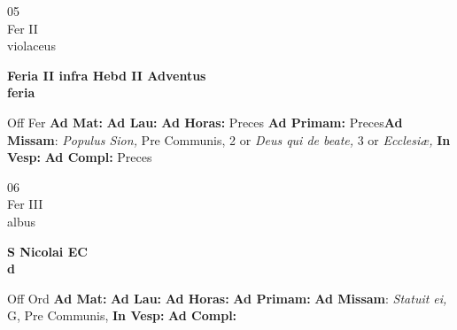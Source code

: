 \documentclass[10pt, openany]{book}
\begin{document}
    \begin{center}
        \begin{minipage}{3.5in}
            \vspace{2em}
            \begin{minipage}{0.5in}
                {\Huge 05} \\
                {\normalsize Fer II} \\
                {\normalsize violaceus}
            \end{minipage}
            \begin{minipage}{3.0in}
                \textbf{ \large Feria II infra Hebd II Adventus \\
                \textnormal{\normalsize feria}} \\ 
            \end{minipage}
            \begin{justify}Off Fer
                \textbf{Ad Mat: }
                \textbf{Ad Lau: }
                \textbf{Ad Horas: }Preces
                \textbf{Ad Primam: }Preces\textbf{Ad Missam}: \textit{Populus Sion,} Pre Communis, 2 or \textit{Deus qui de beate,} 3 or \textit{Ecclesiæ,}  
                \textbf{In Vesp: }
                \textbf{Ad Compl: }Preces
            \end{justify}
        \end{minipage}
    \end{center}

    \begin{center}
        \begin{minipage}{3.5in}
            \vspace{2em}
            \begin{minipage}{0.5in}
                {\Huge 06} \\
                {\normalsize Fer III} \\
                {\normalsize albus}
            \end{minipage}
            \begin{minipage}{3.0in}
                \textbf{ \large S Nicolai EC \\
                \textnormal{\normalsize d}} \\ 
            \end{minipage}
            \begin{justify}Off Ord
                \textbf{Ad Mat: }
                \textbf{Ad Lau: }
                \textbf{Ad Horas: }
                \textbf{Ad Primam: }\textbf{Ad Missam}: \textit{Statuit ei,} G, Pre Communis,  
                \textbf{In Vesp: }
                \textbf{Ad Compl: }
            \end{justify}
        \end{minipage}
    \end{center}
\end{document}
